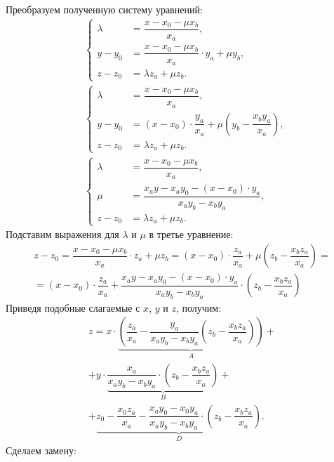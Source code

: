 Преобразуем полученную систему уравнений:
\begin{align*}
& \left\{
\begin{aligned}
    \lambda &= \dfrac{x - x_0 - \mu x_b}{x_a},\\
    y - y_0 &= \dfrac{x - x_0 - \mu x_b}{x_a} \cdot y_a + \mu y_b,\\
    z - z_0 &= \lambda z_a + \mu z_b.
\end{aligned}\right.\\
& \left\{
\begin{aligned}
    \lambda &= \dfrac{x - x_0 - \mu x_b}{x_a},\\
    y - y_0 &= (x - x_0) \cdot \dfrac{y_a}{x_a} + \mu \left(y_b - \dfrac{x_b y_a}{x_a} \right),\\
    z - z_0 &= \lambda z_a + \mu z_b.
\end{aligned}\right.\\
&\left\{
\begin{aligned}
    \lambda &= \dfrac{x - x_0 - \mu x_b}{x_a},\\
    \mu &= \dfrac{x_a y - x_a y_0 - (x - x_0) \cdot y_a}{x_a y_b - x_b y_a},\\
    z - z_0 &= \lambda z_a + \mu z_b.
\end{aligned}\right.
\end{align*}
Подставим выражения для $\lambda$ и $\mu$ в третье уравнение:
\begin{multline*}
    z - z_0 = \dfrac{x - x_0 - \mu x_b}{x_a} \cdot z_a + \mu z_b = (x - x_0) \cdot \dfrac{z_a}{x_a} + \mu \left( z_b - \dfrac{x_b z_a}{x_a} \right) = \\
    = (x - x_0) \cdot \dfrac{z_a}{x_a} + \dfrac{x_a y - x_a y_0 - (x - x_0) \cdot y_a}{x_a y_b - x_b y_a} \cdot \left( z_b - \dfrac{x_b z_a}{x_a} \right)
\end{multline*}
Приведя подобные слагаемые с $x$, $y$ и $z$, получим:
\begin{multline*}
z = x \cdot \underbrace{\left( \dfrac{z_a}{x_a} - \dfrac{y_a}{x_a y_b - x_b y_a} \left( z_b - \dfrac{x_b z_a}{x_a} \right) \right)}_A +\\
+ y \cdot \underbrace{\dfrac{x_a}{x_a y_b - x_b y_a} \cdot \left( z_b - \dfrac{x_b z_a}{x_a} \right)}_B +\\
+ \underbrace{z_0 - \dfrac{x_0 z_a}{x_a} - \dfrac{x_a y_0 - x_0 y_a}{x_a y_b - x_b y_a} \cdot \left( z_b - \dfrac{x_b z_a}{x_a} \right)}_D.
\end{multline*}
Сделаем замену:

